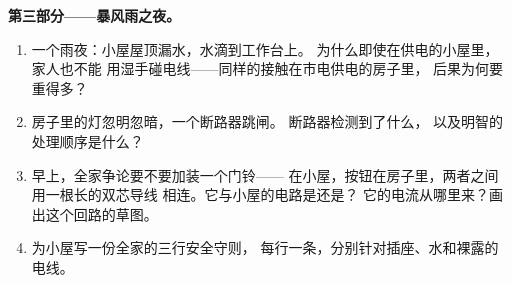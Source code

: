 \begin{problem}
\medskip\noindent\textbf{第三部分——暴风雨之夜。}
\begin{enumerate}[resume]
  \item 一个雨夜：小屋屋顶漏水，水滴到工作台上。
        为什么即使在供电的小屋里，家人也不能
        用湿手碰电线——同样的接触在市电供电的房子里，
        后果为何要重得多？
  \item 房子里的灯忽明忽暗，一个断路器跳闸。
        断路器检测到了什么，
        以及明智的处理顺序是什么？
  \item 早上，全家争论要不要加装一个门铃——
        在小屋，按钮在房子里，两者之间用一根长的双芯导线
        相连。它与小屋的电路是还是？
        它的电流从哪里来？画出这个回路的草图。
  \item 为小屋写一份全家的三行安全守则，
        每行一条，分别针对插座、水和裸露的电线。
\end{enumerate}
\end{problem}
